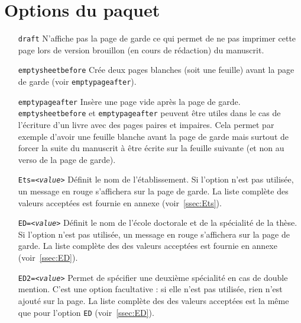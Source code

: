\documentclass{scrartcl}
\newcommand*{\opt}[1]{\texttt{#1}}
\begin{document}
\section{Options du paquet}
\begin{enumerate}
  \item[\opt{draft}] N'affiche pas la page de garde ce qui permet de ne pas imprimer cette page lors de version brouillon (en cours de rédaction) du manuscrit.
	\item[\opt{emptysheetbefore}] Cr\'ee deux pages blanches (soit une feuille) avant la page de garde (voir \opt{emptypageafter}).
	\item[\opt{emptypageafter}] Ins\`ere une page vide apr\`es la page de garde. \\
		\opt{emptysheetbefore} et \opt{emptypageafter} peuvent \^etre utiles dans le cas de l'\'ecriture
        d'un livre avec des pages paires et impaires.
        Cela permet par exemple d'avoir une feuille blanche avant la page de garde mais surtout de forcer
        la suite du manuscrit \`a \^etre \'ecrite sur la feuille suivante (et non au verso de la page de garde).
    \item[\opt{Ets=\textit{<value>}}] D\'efinit le nom de l'\'etablissement. Si l'option n'est pas utilis\'ee, un message en rouge s'affichera sur la page de garde. La liste compl\`ete des valeurs accept\'ees est fournie en annexe (voir~\ref{ssec:Ets}).
    \item[\opt{ED=\textit{<value>}}] D\'efinit le nom de l'\'ecole doctorale et de la sp\'ecialit\'e de la th\`ese. Si l'option n'est pas utilis\'ee, un message en rouge s'affichera sur la page de garde. La liste compl\`ete des des valeurs accept\'ees est fournie en annexe (voir~\ref{ssec:ED}).
    \item[\opt{ED2=\textit{<value>}}] Permet de spécifier une deuxième spécialité en cas de double mention. C'est une option facultative : si elle n'est pas utilis\'ee, rien n'est ajout\'e sur la page. La liste compl\`ete des des valeurs accept\'ees est la m\^eme que pour l'option \opt{ED} (voir~\ref{ssec:ED}).
\end{enumerate}

\end{document}
